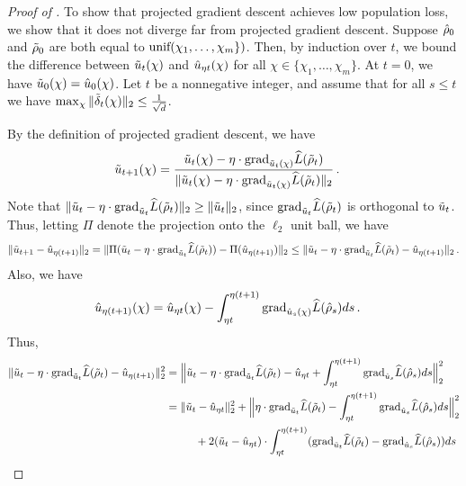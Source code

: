 \begin{proof}[Proof of ]
To show that projected gradient descent achieves low population loss, we show that it does not diverge far from projected gradient descent. Suppose ${\hat{\rho}}_0$ and ${\tilde{\rho}}_0$ are both equal to $\textup{unif}(\chi_1, \ldots, \chi_m\})$. Then, by induction over $t$, we bound the difference between $\tilde{u}_t(\chi)$ and $\hat{u}_{\eta t}(\chi)$ for all $\chi \in \{\chi_1, \ldots, \chi_m\}$. At $t = 0$, we have $\tilde{u}_0(\chi) = \hat{u}_0(\chi)$. Let $t$ be a nonnegative integer, and assume that for all $s \leq t$ we have $\max_\chi \|{\tilde{\delta}}_t(\chi)\|_2 \leq \frac{1}{\sqrt{d}}$.

By the definition of projected gradient descent, we have
\begin{align}
\tilde{u}_{t + 1}(\chi) 
& = \frac{\tilde{u}_t(\chi) - \eta \cdot {\textup{grad}}_{\tilde{u}_t(\chi)} \widehat{L}({\tilde{\rho}}_t)}{\|\tilde{u}_t(\chi) - \eta \cdot {\textup{grad}}_{\tilde{u}_t(\chi)} \widehat{L}({\tilde{\rho}}_t)\|_2} \,.
\end{align}
Note that $\|\tilde{u}_t - \eta \cdot {\textup{grad}}_{\tilde{u}_t} \widehat{L}({\tilde{\rho}}_t)\|_2 \geq \|\tilde{u}_t\|_2$, since ${\textup{grad}}_{\tilde{u}_t} \widehat{L}({\tilde{\rho}}_t)$ is orthogonal to $\tilde{u}_t$. Thus, letting $\Pi$ denote the projection onto the $\ell_2$ unit ball, we have
\begin{align}
\|\tilde{u}_{t + 1} - \hat{u}_{\eta (t + 1)}\|_2
 = \|\Pi(\tilde{u}_t - \eta \cdot {\textup{grad}}_{\tilde{u}_t} \widehat{L}({\tilde{\rho}}_t)) - \Pi(\hat{u}_{\eta (t + 1)})\|_2
 \leq \|\tilde{u}_t - \eta \cdot {\textup{grad}}_{\tilde{u}_t} \widehat{L}({\tilde{\rho}}_t) - \hat{u}_{\eta (t + 1)}\|_2 \,.
\end{align}
Also, we have
\begin{align}
\hat{u}_{\eta (t + 1)}(\chi)
& = \hat{u}_{\eta t}(\chi) - \int_{\eta t}^{\eta (t + 1)} {\textup{grad}}_{\hat{u}_s(\chi)} \widehat{L}({\hat{\rho}}_s) ds \,.
\end{align}
Thus,
\begin{align}
\|\uGD_t - \eta \cdot \pgrad_{\uGD_t} \Lhat(\rhoGD_t) - \uhat_{\eta (t + 1)} \|_2^2
& = \Big\|\uGD_t - \eta \cdot \pgrad_{\uGD_t} \Lhat(\rhoGD_t) - \uhat_{\eta t} + \int_{\eta t}^{\eta (t + 1)} \pgrad_{\uhat_s} \Lhat(\rhohat_s) ds \Big\|_2^2 \\
& = \|\uGD_t - \uhat_{\eta t}\|_2^2 + \Big\|\eta \cdot \pgrad_{\uGD_t} \Lhat(\rhoGD_t) - \int_{\eta t}^{\eta (t + 1)} \pgrad_{\uhat_s} \Lhat(\rhohat_s) ds \Big\|_2^2 \\
& \nextlinespace + 2 (\uGD_t - \uhat_{\eta t}) \cdot \int_{\eta t}^{\eta (t + 1)} (\pgrad_{\uGD_t} \Lhat(\rhoGD_t) - \pgrad_{\uhat_s} \Lhat(\rhohat_s)) ds  \\

\end{align}
\end{proof}
